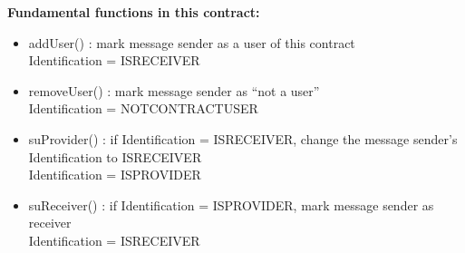 \textbf{Fundamental functions in this contract:}
\begin{itemize}
    \item addUser() : mark message sender as a user of this contract\\
    Identification = ISRECEIVER
    \item removeUser() : mark message sender as ``not a user''\\
    Identification = NOTCONTRACTUSER
    \item suProvider() : if Identification = ISRECEIVER, change the message sender's Identification to ISRECEIVER\\
    Identification = ISPROVIDER
    \item suReceiver() : if Identification = ISPROVIDER, mark message sender as receiver\\
    Identification = ISRECEIVER
\end{itemize}
%


